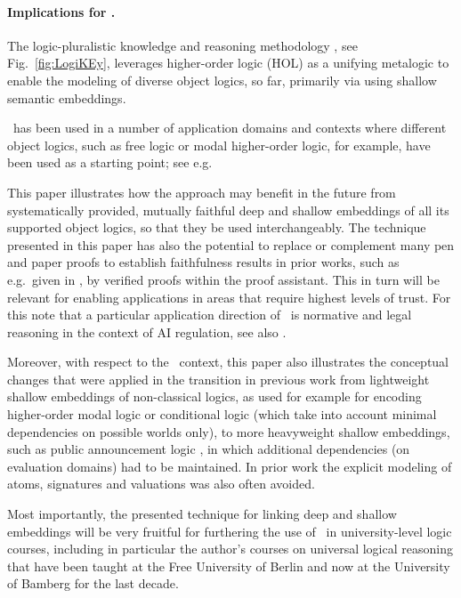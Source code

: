 \paragraph{Implications for \logikey.}
The logic-pluralistic knowledge and reasoning methodology \logikey \cite{J48}, see Fig.~\ref{fig:LogiKEy}, leverages higher-order logic (HOL) as a unifying metalogic to enable the modeling of diverse object logics, so far,  primarily via using shallow semantic embeddings. 

\logikey\ has been used in a number of application domains and contexts where different object logics, such as free logic or modal higher-order logic, for example, have been used as a starting point; see e.g.~\cite{J40,J75,J68} 

This paper illustrates how the \logikey approach may benefit in the future from systematically provided, mutually faithful deep and shallow embeddings of all its supported object logics, so that they be used interchangeably. 
The technique presented in this paper has also the potential to replace or complement many pen and paper proofs to establish faithfulness results in prior works, such as e.g.~given in \cite{J23,J31,J58}, by verified proofs within the proof assistant. This in turn will be relevant for enabling applications in areas that require highest levels of trust. For this note that a particular application direction of \logikey\ is normative and legal reasoning in the context of AI regulation, see also \cite{R93}.

Moreover, with respect to the \logikey\ context, this paper also illustrates the conceptual changes that were applied in the transition in previous work from lightweight shallow embeddings of non-classical logics, as used for example for encoding higher-order modal logic \cite{J23} or conditional logic \cite{J31} (which take into account minimal dependencies on possible worlds only), to more heavyweight shallow embeddings, such as public announcement logic \cite{J58}, in which additional dependencies (on evaluation domains) had to be maintained. In prior work the explicit modeling of atoms, signatures and valuations was also often avoided.

Most importantly, the presented technique for linking deep and shallow embeddings will be very fruitful for furthering the use of \logikey\ in university-level logic courses, including in particular the author's courses on universal logical reasoning that have been taught at the Free University of Berlin and now at the University of Bamberg for the last decade.


